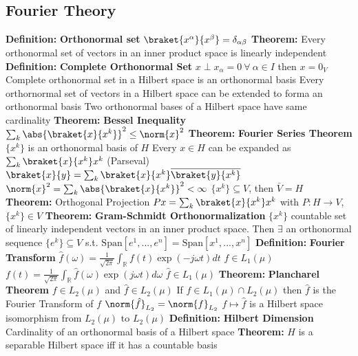 \documentclass[14pt]{extarticle}
\def\Definition{{\color{blue} \textbf{Definition:} }}
\def\Theorem{{\color{red} \textbf{Theorem:} }}
\begin{document}
\begin{outline}
	\section*{Fourier Theory}
		\1	\Definition \textbf{Orthonormal set}
			\2	$\braket{x^{\alpha}}{x^{\beta}} = \delta_{\alpha\beta}$
		\1	\Theorem Every orthonormal set of vectors in an inner product space is
				linearly independent
		\1	\Definition \textbf{Complete Orthonormal Set}
			\2	$x \perp x_{\alpha} = 0~\forall~\alpha \in I$ then $x = 0_V$
			\2	Complete orthonormal set in a Hilbert space is an orthonormal basis
			\2	Every orthornormal set of vectors in a Hilbert space can be extended to 
					forma an orthonormal basis
			\2	Two orthonormal bases of a Hilbert space have same cardinality
		\1	\Theorem \textbf{Bessel Inequality}
			\2	$\sum_k \abs{\braket{x}{x^k}}^2 \le \norm{x}^2$
		\1	\Theorem \textbf{Fourier Series Theorem}
			\2	$\{x^k\}$ is an orthonormal basis of $H$
			\2	Every $x \in H$ can be expanded as $\sum_k \braket{x}{x^k}x^k$
			\2	(Parseval) $\braket{x}{y} = \sum_k \braket{x}{x^k}\overline{\braket{y}{x^k}}$
			\2	$\norm{x}^2 = \sum_k \abs{\braket{x}{x^k}}^2 < \infty$
			\2	$\{x^k\} \subseteq V$, then $\bar{V} = H$
		\1	\Theorem Orthogonal Projection
			\2	$Px = \sum_k \braket{x}{x^k}x^k$ with $P : H \rightarrow V$, $\{x^k\} \in V$
		\1	\Theorem \textbf{Gram-Schmidt Orthonormalization}
			\2	$\{x^k\}$ countable set of linearly independent vectors in an inner product
					space.  Then $\exists$ an orthonormal sequence $\{e^k\} \subseteq V$
					s.t. $\text{Span}[e^1,...,e^n] = \text{Span}[x^1,...,x^n]$
		\1	\Definition \textbf{Fourier Transform}
			\2	$\hat{f}(\omega) = \frac{1}{\sqrt{2\pi}}\int_{\mathbb{R}} f(t)\exp(-j\omega t) dt$
				\3	$f \in L_1(\mu)$
			\2	$f(t) = \frac{1}{\sqrt{2\pi}}\int_{\mathbb{R}}\hat{f}(\omega)\exp(j\omega t) d\omega$
				\3	$\hat{f} \in L_1(\mu)$
		\1	\Theorem \textbf{Plancharel Theorem}
			\2	$f \in L_2(\mu)$ and $\hat{f} \in L_2(\mu)$
			\2	If $f \in L_1(\mu) \cap L_2(\mu)$ then $\hat{f}$ is the Fourier Transform of $f$
			\2	$\norm{\hat{f}}_{L_2} = \norm{f}_{L_2}$
			\2	$f \mapsto \hat{f}$ is a Hilbert space isomorphism from $L_2(\mu)$ to $L_2(\mu)$
		\1	\Definition \textbf{Hilbert Dimension}
			\2	Cardinality of an orthonormal basis of a Hilbert space
		\1	\Theorem $H$ is a separable Hilbert space iff it has a countable basis

	\end{outline}
\end{document}
